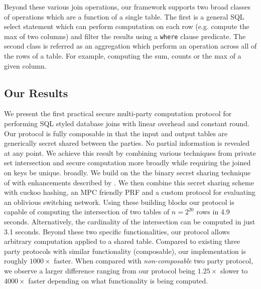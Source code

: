Beyond these various join operations, our framework supports two broad classes of operations which are a function of a single table. The first is a general SQL select statement which can perform computation on each row (e.g. compute the max of two columns) and filter the results using a \texttt{where} clause predicate. The second class is referred as an aggregation which perform an operation across all of the rows of a table. For example, computing the sum, counts or the max of a given column. 



\subsection{Our Results}

We present the first practical secure multi-party computation protocol for performing SQL styled database joins with linear overhead and constant round. Our protocol is fully composable in that the input and output tables are generically secret shared between the parties. 
\iffullversion
	No partial information is revealed at any point. 
\fi
	We achieve this result by combining various techniques from private set intersection and secure computation more 
\iffullversion 
	broadly while requiring the joined on keys be unique.
\else
	broadly.
\fi
 We build on the the binary secret sharing technique of \cite{highthroughput} with enhancements described by \cite{aby3}. We then combine this secret sharing scheme with cuckoo hashing\cite{usenix:PSZ14}, an MPC friendly PRF\cite{lowmc} and a custom protocol for evaluating an oblivious switching network\cite{MS13}. Using these building blocks our protocol is capable of computing the intersection of two tables of $n=2^{20}$ rows in 4.9 seconds. 
\iffullversion 
	Alternatively, the cardinality of the intersection can be computed in just 3.1 seconds.
\fi
  Beyond these two specific functionalities, our protocol allows arbitrary computation applied to a shared table. Compared to existing three party protocols with similar functionality (composable), our implementation is roughly $1000\times$ faster. When compared with \emph{non-composable} two party protocol, we observe a larger difference ranging from our protocol being $1.25\times$ slower to $4000\times$ faster depending on what functionality is being computed. 


